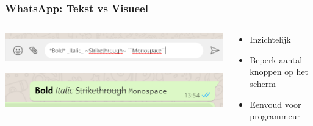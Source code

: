 \documentclass[../presentatie.tex]{subfiles}
\begin{document}
    \begin{frame}
        \frametitle{WhatsApp: Tekst vs Visueel}
        \begin{columns}
            \begin{column}{0.5\textwidth}
                \includegraphics[width=\linewidth]{assets/whatsappStyles2.png}
                
                \bigskip
                
                \includegraphics[width=\linewidth]{assets/whatsappStylesResult2.png}
            \end{column}
            \begin{column}{0.5\textwidth}
                \begin{itemize}
                    \item Inzichtelijk
                    \item Beperk aantal knoppen op het scherm
                    \item Eenvoud voor programmeur
                \end{itemize}
            \end{column}
        \end{columns}
    \end{frame}
    
\end{document}
